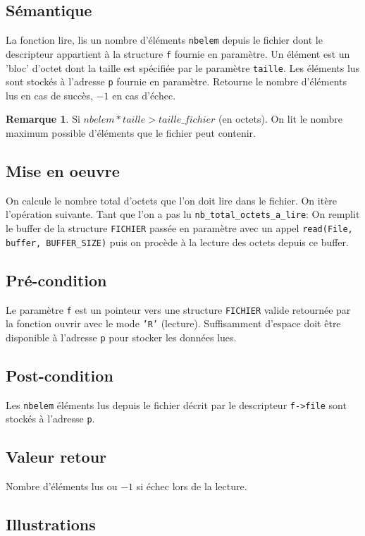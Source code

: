 \documentclass[11pt]{article}
\theoremstyle{definition}
\theoremstyle{definition}
\newtheorem*{myrem}{Remarque}
\begin{document}
\subsection{Sémantique}
La fonction lire, lis un nombre d'éléments \texttt{nbelem} depuis le fichier dont le descripteur
appartient à la structure \texttt{f} fournie en paramètre.
Un élément est un 'bloc' d'octet dont la taille est spécifiée par le paramètre
\texttt{taille}.
Les éléments lus sont stockés à l'adresse \texttt{p} fournie en paramètre.
Retourne le nombre d'éléments lus en cas de succès, $-1$ en cas d'échec.
\begin{myrem}
  Si $nbelem*taille > taille\_fichier$ (en octets).
  On lit le nombre maximum possible d'éléments que le fichier peut contenir.
\end{myrem}

\subsection{Mise en oeuvre}
On calcule le nombre total d'octets que l'on doit lire dans le fichier.
On itère l'opération suivante.
Tant que l'on a pas lu \texttt{nb\_total\_octets\_a\_lire}:
On remplit le buffer de la structure \texttt{FICHIER} passée en paramètre
avec un appel \texttt{read(File, buffer, BUFFER\_SIZE)} puis on procède à la lecture des
octets depuis ce buffer.

\subsection{Pré-condition}
Le paramètre \texttt{f} est un pointeur vers une structure \texttt{FICHIER} valide retournée par
la fonction ouvrir avec le mode \texttt{'R'} (lecture).
Suffisamment d'espace doit être disponible à l'adresse \texttt{p} pour stocker les données lues.

\subsection{Post-condition}
Les \texttt{nbelem} éléments lus depuis le fichier
décrit par le descripteur \texttt{f->file} sont stockés à l'adresse \texttt{p}.     

\subsection{Valeur retour}
Nombre d'éléments lus ou $-1$ si échec lors de la lecture.

\subsection{Illustrations}
\end{document}
